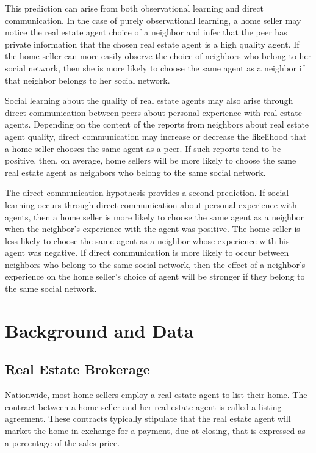 \documentclass[12pt]{article}
\begin{document}
    This prediction can arise from both observational learning and direct communication. In the case of purely observational learning,
    a home seller may notice the real estate agent choice of a neighbor and infer that the peer has private information that the chosen real estate
    agent is a high quality agent. If the home seller can more easily observe the choice of neighbors who belong to her social network, then she is
    more likely to choose the same agent as a neighbor if that neighbor belongs to her social network.

    Social learning about the quality of real estate agents may also arise through direct communication between peers about personal experience with
    real estate agents. Depending on the content of the reports from neighbors about real estate agent quality, direct communication may increase or decrease the likelihood that a home seller
    chooses the same agent as a peer. If such reports tend to be positive, then, on average, home sellers will be more likely to choose the same real
    estate agent as neighbors who belong to the same social network.

    The direct communication hypothesis provides a second prediction. If social learning occurs through direct communication about personal
    experience with agents, then a home seller is more likely to choose the same agent as a neighbor when the neighbor's experience with the agent was
    positive. The home seller is less likely to choose the same agent as a neighbor whose experience with his agent was negative. If direct
    communication is more likely to occur between neighbors who belong to the same social network, then the effect of a neighbor's experience on the
    home seller's choice of agent will be stronger if they belong to the same social network.


\section{Background and Data}

\subsection*{Real Estate Brokerage}
    Nationwide, most home sellers employ a real estate agent to list their home. The contract between a home seller and her real estate agent is  called a listing agreement. These contracts typically stipulate that the real estate agent will market the home in exchange for a payment, due at  closing, that is expressed as a percentage of the sales price.
\end{document}
